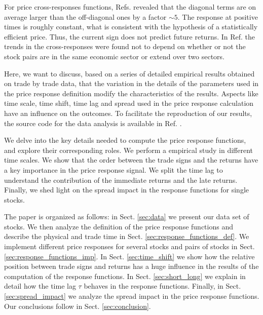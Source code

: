 For price cross-responses functions, Refs.
\cite{dissecting_cross,Wang_2016_cross} revealed that the diagonal terms are on
average larger than the off-diagonal ones by a factor $\sim 5$. The response at
positive times is roughly constant, what is consistent with the hypothesis of a
statistically efficient price. Thus, the current sign does not predict future
returns. In Ref. \cite{Wang_2016_cross} the trends in the cross-responses were
found not to depend on whether or not the stock pairs are in the same economic
sector or extend over two sectors.

Here, we want to discuss, based on a series of detailed empirical results
obtained on trade by trade data, that the variation in the details of the
parameters used in the price response definition modify the characteristics of
the results. Aspects like time scale, time shift, time lag and spread used in
the price response calculation have an influence on the outcomes. To facilitate
the reproduction of our results, the source code for the data analysis is
available in Ref. \cite{code}.

We delve into the key details needed to compute the price response functions,
and explore their corresponding roles. We perform a empirical study in
different time scales. We show that the order between the trade signs and
the returns have a key importance in the price response signal. We split the
time lag to understand the contribution of the immediate returns and the late
returns. Finally, we shed light on the spread impact in the response functions
for single stocks.

The paper is organized as follows: in Sect. \ref{sec:data} we present our data
set of stocks. We then analyze the definition of the price response functions
and describe the physical and trade time in Sect.
\ref{sec:response_functions_def}. We implement different price responses for
several stocks and pairs of stocks in Sect. \ref{sec:response_functions_imp}.
In Sect. \ref{sec:time_shift} we show how the relative position between trade
signs and returns has a huge influence in the results of the computation of the
response functions. In Sect. \ref{sec:short_long} we explain in detail how the
time lag $\tau$ behaves in the response functions. Finally, in Sect.
\ref{sec:spread_impact} we analyze the spread impact in the price response
functions. Our conclusions follow in Sect. \ref{sec:conclusion}.
